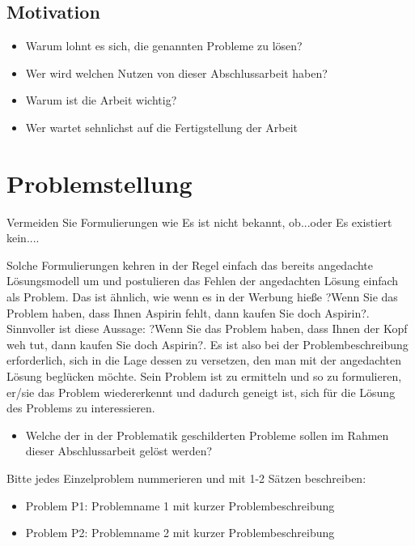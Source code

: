 \documentclass[headsepline,titlepage,twoside,12pt]{report}
\begin{document}
\subsection{Motivation}

\begin{itemize}

\item Warum lohnt es sich, die genannten Probleme zu lösen?
\item Wer wird welchen Nutzen von dieser Abschlussarbeit haben?
\item Warum ist die Arbeit wichtig?
\item Wer wartet sehnlichst auf die Fertigstellung der Arbeit

\end{itemize}

\section{Problemstellung}

Vermeiden Sie Formulierungen wie \glqq Es ist nicht bekannt, ob...\grqq oder \glqq Es existiert kein...\grqq.

Solche Formulierungen kehren in der Regel einfach das bereits angedachte Lösungsmodell um und postulieren das Fehlen der angedachten Lösung einfach als Problem. Das ist ähnlich, wie wenn es  in der Werbung hieße ?Wenn Sie das Problem haben, dass Ihnen Aspirin fehlt, dann kaufen Sie doch Aspirin?. Sinnvoller ist diese Aussage:  ?Wenn Sie das Problem haben, dass Ihnen der Kopf weh tut, dann kaufen Sie doch Aspirin?. Es ist also bei der Problembeschreibung erforderlich, sich in die Lage dessen zu versetzen, den man mit der angedachten Lösung beglücken möchte. Sein Problem ist zu ermitteln und so zu formulieren, er/sie das Problem wiedererkennt und dadurch geneigt ist, sich für die Lösung des Problems zu interessieren.

\begin{itemize}

\item Welche der in der Problematik geschilderten Probleme sollen im Rahmen dieser Abschlussarbeit gelöst werden?
\end{itemize}
Bitte jedes Einzelproblem nummerieren und mit 1-2 Sätzen beschreiben:

\begin{itemize}


\item Problem P1: Problemname 1 mit kurzer Problembeschreibung
\item Problem P2: Problemname 2 mit kurzer Problembeschreibung
\end{itemize}
\end{document}
